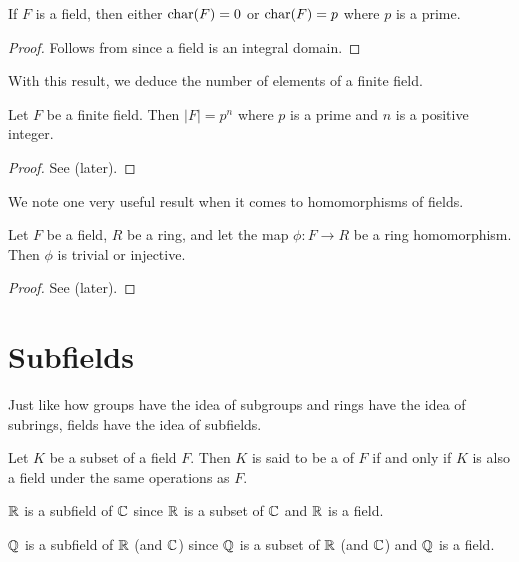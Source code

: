 \begin{proposition}
    If $F$ is a field, then either $\mathrm{char}(F) = 0$ or $\mathrm{char}(F) = p$ where $p$ is a prime.
\end{proposition}
\begin{proof}
    Follows from  since a field is an integral domain.
\end{proof}

With this result, we deduce the number of elements of a finite field.
\begin{theorem}\label{thrm-finite-field-has-prime-power-order}
    Let $F$ be a finite field. Then $|F| = p^n$ where $p$ is a prime and $n$ is a positive integer.
\end{theorem}
\begin{proof}
    See  (later).
\end{proof}

We note one very useful result when it comes to homomorphisms of fields.
\begin{theorem}\label{thrm-homomorphism-from-field-is-injective-or-trivial}
    Let $F$ be a field, $R$ be a ring, and let the map $\phi: F \to R$ be a ring homomorphism. Then $\phi$ is trivial or injective.
\end{theorem}
\begin{proof}
    See  (later).
\end{proof}

\section{Subfields}
Just like how groups have the idea of subgroups and rings have the idea of subrings, fields have the idea of subfields.
\begin{definition}
    Let $K$ be a subset of a field $F$. Then $K$ is said to be a  of $F$ if and only if $K$ is also a field under the same operations as $F$.
\end{definition}

\begin{example}
    $\mathbb{R}$ is a subfield of $\mathbb{C}$ since $\mathbb{R}$ is a subset of $\mathbb{C}$ and $\mathbb{R}$ is a field.
\end{example}
\begin{example}
    $\mathbb{Q}$ is a subfield of $\mathbb{R}$ (and $\mathbb{C}$) since $\mathbb{Q}$ is a subset of $\mathbb{R}$ (and $\mathbb{C}$) and $\mathbb{Q}$ is a field.
\end{example}

